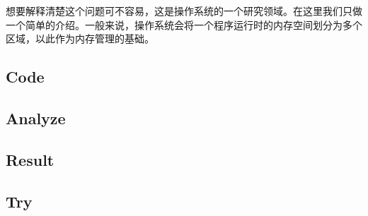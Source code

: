 想要解释清楚这个问题可不容易，这是操作系统的一个研究领域。在这里我们只做一个简单的介绍。一般来说，操作系统会将一个程序运行时的内存空间划分为多个区域，以此作为内存管理的基础。

\subsection{Code}

\subsection{Analyze}

\subsection{Result}

\subsection{Try}


